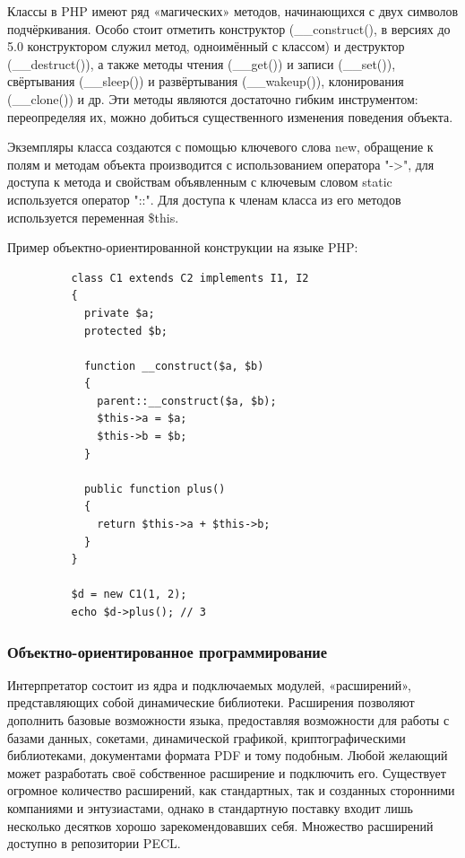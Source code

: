 Классы в PHP имеют ряд «магических» методов, начинающихся с двух символов подчёркивания. Особо стоит отметить конструктор (\_\_construct(), в версиях до 5.0 конструктором служил метод, одноимённый с классом) и деструктор (\_\_destruct()), а также методы чтения (\_\_get()) и записи (\_\_set()), свёртывания (\_\_sleep()) и развёртывания (\_\_wakeup()), клонирования (\_\_clone()) и др. Эти методы являются достаточно гибким инструментом: переопределяя их, можно добиться существенного изменения поведения объекта.

Экземпляры класса создаются с помощью ключевого слова new, обращение к полям и методам объекта производится с использованием оператора "->", для доступа к метода и свойствам объявленным с ключевым словом static используется оператор "::". Для доступа к членам класса из его методов используется переменная \$this.

Пример объектно-ориентированной конструкции на языке PHP: 
\begin{lstlisting}
          class C1 extends C2 implements I1, I2
          {
            private $a;
            protected $b;

            function __construct($a, $b)
            {
              parent::__construct($a, $b);
              $this->a = $a;
              $this->b = $b;
            }

            public function plus()
            {
              return $this->a + $this->b;
            }
          }

          $d = new C1(1, 2);
          echo $d->plus(); // 3
\end{lstlisting}

\subsubsection{Объектно-ориентированное программирование }
\label{sub:practice:extebtions_php}
Интерпретатор состоит из ядра и подключаемых модулей, «расширений», представляющих собой динамические библиотеки. Расширения позволяют дополнить базовые возможности языка, предоставляя возможности для работы с базами данных, сокетами, динамической графикой, криптографическими библиотеками, документами формата PDF и тому подобным. Любой желающий может разработать своё собственное расширение и подключить его. Существует огромное количество расширений, как стандартных, так и созданных сторонними компаниями и энтузиастами, однако в стандартную поставку входит лишь несколько десятков хорошо зарекомендовавших себя. Множество расширений доступно в репозитории PECL.


